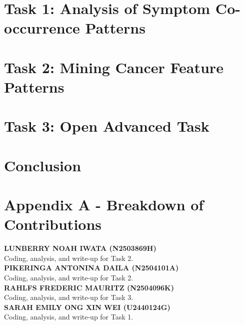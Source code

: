 \documentclass[12pt]{article}
\begin{document}
\tableofcontents

\pagebreak
{}
\section{Task 1: Analysis of Symptom Co-occurrence Patterns}

\pagebreak
\section{Task 2: Mining Cancer Feature Patterns}

\pagebreak
\section{Task 3: Open Advanced Task}

\pagebreak
\section{Conclusion} %

\pagebreak
\section*{Appendix A - Breakdown of Contributions}
\renewcommand{\thepage}{A-\arabic{page}}

\textbf{LUNBERRY NOAH IWATA (N2503869H)} \\
Coding, analysis, and write-up for Task 2. \\

\textbf{PIKERINGA ANTONINA DAILA (N2504101A)} \\
Coding, analysis, and write-up for Task 2. \\

\textbf{RAHLFS FREDERIC MAURITZ (N2504096K)} \\
Coding, analysis, and write-up for Task 3. \\

\textbf{SARAH EMILY ONG XIN WEI (U2440124G)} \\
Coding, analysis, and write-up for Task 1. \\
\end{document}

